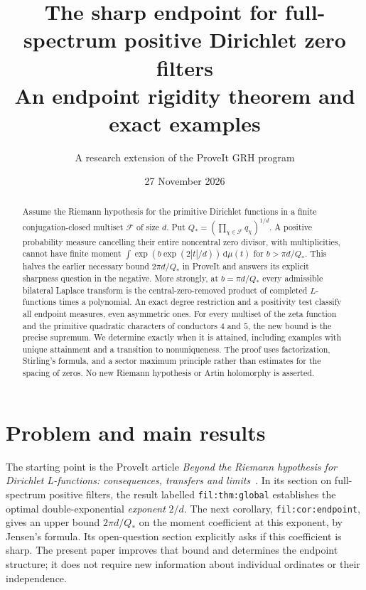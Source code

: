 \documentclass[11pt]{article}
\title{The sharp endpoint for full-spectrum positive Dirichlet zero filters\\[4pt]\large An endpoint rigidity theorem and exact examples}
\author{A research extension of the ProveIt GRH program}
\date{27 November 2026}
\theoremstyle{remark}\newtheorem{remark}[theorem]{Remark}
\newcommand{\F}{\mathcal F}\newcommand{\dd}{\,\mathrm d}
\begin{document}
\maketitle
\begin{abstract}
Assume the Riemann hypothesis for the primitive Dirichlet functions in a finite conjugation-closed multiset $\F$ of size $d$. Put $Q_*=(\prod_{\chi\in\F}q_\chi)^{1/d}$. A positive probability measure cancelling their entire noncentral zero divisor, with multiplicities, cannot have finite moment $\int\exp(b\exp(2|t|/d))\dd\mu(t)$ for $b>\pi d/Q_*$. This halves the earlier necessary bound $2\pi d/Q_*$ in ProveIt and answers its explicit sharpness question in the negative. More strongly, at $b=\pi d/Q_*$ every admissible bilateral Laplace transform is the central-zero-removed product of completed $L$-functions times a polynomial. An exact degree restriction and a positivity test classify all endpoint measures, even asymmetric ones. For every multiset of the zeta function and the primitive quadratic characters of conductors $4$ and $5$, the new bound is the precise supremum. We determine exactly when it is attained, including examples with unique attainment and a transition to nonuniqueness. The proof uses factorization, Stirling's formula, and a sector maximum principle rather than estimates for the spacing of zeros. No new Riemann hypothesis or Artin holomorphy is asserted.
\end{abstract}

\section{Problem and main results}
The starting point is the ProveIt article \emph{Beyond the Riemann hypothesis for Dirichlet L-functions: consequences, transfers and limits}~\cite{proveit}. In its section on full-spectrum positive filters, the result labelled \texttt{fil:thm:global} establishes the optimal double-exponential \emph{exponent} $2/d$. The next corollary, \texttt{fil:cor:endpoint}, gives an upper bound $2\pi d/Q_*$ on the moment coefficient at this exponent, by Jensen's formula. Its open-question section explicitly asks if this coefficient is sharp. The present paper improves that bound and determines the endpoint structure; it does not require new information about individual ordinates or their independence.
\end{document}
